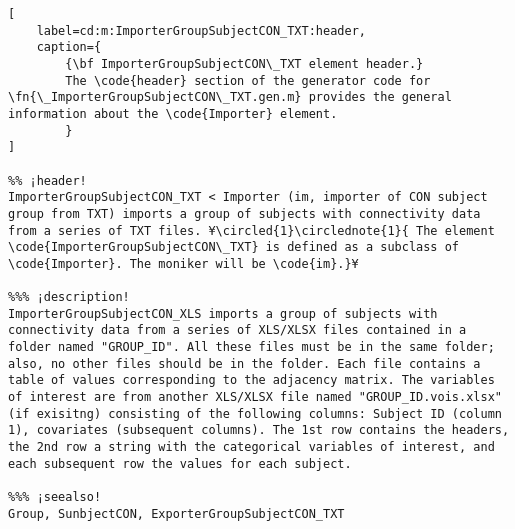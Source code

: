 \documentclass{tufte-handout}
\begin{document}
\begin{lstlisting}[
	label=cd:m:ImporterGroupSubjectCON_TXT:header,
	caption={
		{\bf ImporterGroupSubjectCON\_TXT element header.}
		The \code{header} section of the generator code for \fn{\_ImporterGroupSubjectCON\_TXT.gen.m} provides the general information about the \code{Importer} element.
		}
]

%% ¡header!
ImporterGroupSubjectCON_TXT < Importer (im, importer of CON subject group from TXT) imports a group of subjects with connectivity data from a series of TXT files. ¥\circled{1}\circlednote{1}{ The element \code{ImporterGroupSubjectCON\_TXT} is defined as a subclass of \code{Importer}. The moniker will be \code{im}.}¥

%%% ¡description!
ImporterGroupSubjectCON_XLS imports a group of subjects with connectivity data from a series of XLS/XLSX files contained in a folder named "GROUP_ID". All these files must be in the same folder; also, no other files should be in the folder. Each file contains a table of values corresponding to the adjacency matrix. The variables of interest are from another XLS/XLSX file named "GROUP_ID.vois.xlsx" (if exisitng) consisting of the following columns: Subject ID (column 1), covariates (subsequent columns). The 1st row contains the headers, the 2nd row a string with the categorical variables of interest, and each subsequent row the values for each subject.

%%% ¡seealso!
Group, SunbjectCON, ExporterGroupSubjectCON_TXT

\end{lstlisting}
\end{document}
